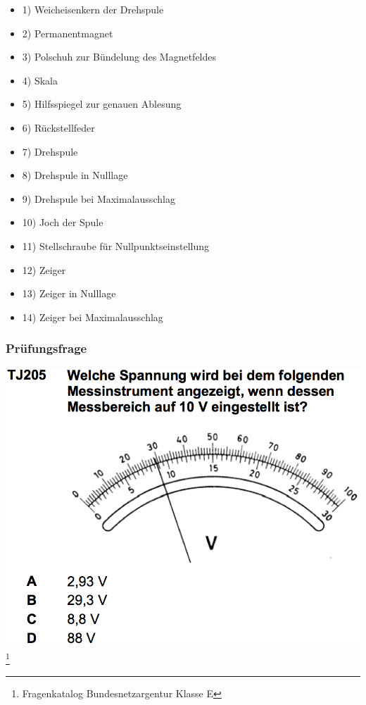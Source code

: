\begin{frame}
		\hspace{0.5cm}
	\begin{minipage}{0.4\textwidth}	
	\begin{itemize} \tiny
		\item \tiny 1) Weicheisenkern der Drehspule
		\item 2) Permanentmagnet
		\item 3) Polschuh zur Bündelung des Magnetfeldes
		\item 4) Skala
		\item 5) Hilfsspiegel zur genauen Ablesung
		\item 6) Rückstellfeder
		\item 7) Drehspule
		\item 8) Drehspule in Nulllage
		\item 9) Drehspule bei Maximalausschlag
		\item 10) Joch der Spule
		\item 11) Stellschraube für Nullpunktseinstellung
		\item 12) Zeiger
		\item 13) Zeiger in Nulllage
		\item 14) Zeiger bei Maximalausschlag
	\end{itemize}
	\end{minipage}
\end{frame}

\begin{frame}
    \frametitle{Prüfungsfrage}
    \begin{center}
        \includegraphics[width=.95\textwidth]{e17/messbereich.png}
        \footnote{\tiny Fragenkatalog Bundesnetzargentur Klasse E}
	\end{center}
\end{frame}

